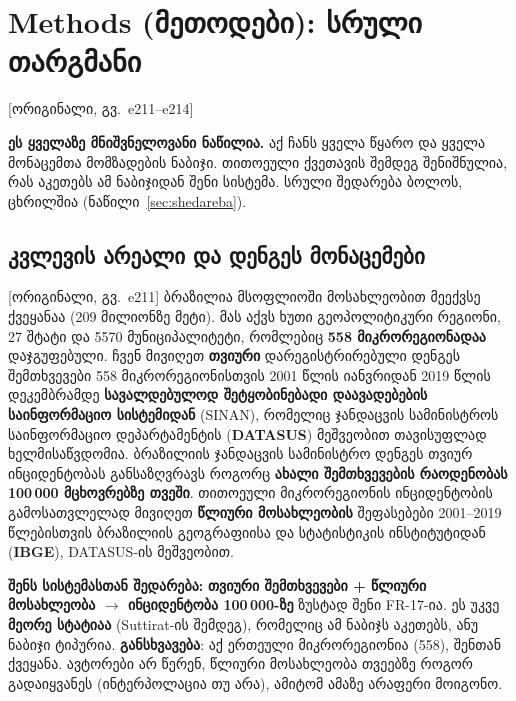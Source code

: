 \documentclass[11pt,a4paper]{article}
\newcommand{\pg}[1]{{\small\color{gray}[ორიგინალი, გვ.~#1]}}
\begin{document}
\section{Methods (მეთოდები): სრული თარგმანი} \pg{e211--e214}

\begin{etl}
\textbf{ეს ყველაზე მნიშვნელოვანი ნაწილია.} აქ ჩანს ყველა წყარო და ყველა მონაცემთა მომზადების ნაბიჯი. თითოეული ქვეთავის შემდეგ
შენიშნულია, რას აკეთებს ამ ნაბიჯიდან შენი სისტემა. სრული შედარება ბოლოს, ცხრილშია (ნაწილი~\ref{sec:shedareba}).
\end{etl}

\subsection*{კვლევის არეალი და დენგეს მონაცემები} \pg{e211}
ბრაზილია მსოფლიოში მოსახლეობით მეექვსე ქვეყანაა (209 მილიონზე მეტი). მას აქვს ხუთი გეოპოლიტიკური რეგიონი, 27 შტატი და 5570
მუნიციპალიტეტი, რომლებიც \textbf{558 მიკრორეგიონადაა} დაჯგუფებული. ჩვენ მივიღეთ \textbf{თვიური} დარეგისტრირებული დენგეს
შემთხვევები 558 მიკრორეგიონისთვის 2001 წლის იანვრიდან 2019 წლის დეკემბრამდე \textbf{სავალდებულოდ შეტყობინებადი დაავადებების
საინფორმაციო სისტემიდან} (SINAN), რომელიც ჯანდაცვის სამინისტროს საინფორმაციო დეპარტამენტის (\textbf{DATASUS}) მეშვეობით
თავისუფლად ხელმისაწვდომია. ბრაზილიის ჯანდაცვის სამინისტრო დენგეს თვიურ ინციდენტობას განსაზღვრავს როგორც
\textbf{ახალი შემთხვევების რაოდენობას 100\,000 მცხოვრებზე თვეში}. თითოეული მიკრორეგიონის ინციდენტობის გამოსათვლელად
მივიღეთ \textbf{წლიური მოსახლეობის} შეფასებები 2001--2019 წლებისთვის ბრაზილიის გეოგრაფიისა და სტატისტიკის ინსტიტუტიდან
(\textbf{IBGE}), DATASUS-ის მეშვეობით.

\begin{etl}
\textbf{შენს სისტემასთან შედარება:} \textbf{თვიური შემთხვევები + წლიური მოსახლეობა $\rightarrow$ ინციდენტობა 100\,000-ზე} ზუსტად
შენი FR-17-ია. ეს უკვე \textbf{მეორე სტატიაა} (Suttirat-ის შემდეგ), რომელიც ამ ნაბიჯს აკეთებს, ანუ ნაბიჯი ტიპურია.
\textbf{განსხვავება}: აქ ერთეული მიკრორეგიონია (558), შენთან ქვეყანა. ავტორები არ წერენ, წლიური მოსახლეობა თვეებზე როგორ
გადაიყვანეს (ინტერპოლაცია თუ არა), ამიტომ ამაზე არაფერი მოიგონო.
\end{etl}
\end{document}
